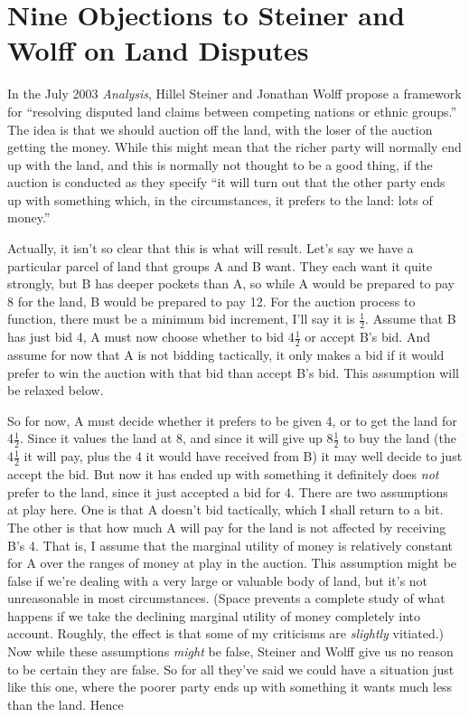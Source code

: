 %
%
%
%
%
%
%
%
%
%
\chapter{Nine Objections to Steiner and Wolff on Land Disputes}


In the July 2003 \textit{Analysis}, Hillel Steiner and Jonathan Wolff \citeyearpar{Steiner2003} propose a framework for ``resolving disputed land claims between competing nations or ethnic groups.'' The idea is that we should auction off the land, with the loser of the auction getting the money. While this might mean that the richer party will normally end up with the land, and this is normally not thought to be a good thing, if the auction is conducted as they specify ``it will turn out that the other party ends up with something which, in the circumstances, it prefers to the land: lots of money.''

Actually, it isn't so clear that this is what will result. Let's say we have a particular parcel of land that groups A and B want. They each want it quite strongly, but B has deeper pockets than A, so while A would be prepared to pay 8 for the land, B would be prepared to pay 12.  For the auction process to function, there must be a minimum bid increment, I'll say it is \(\frac{1}{2}\). Assume that B has just bid 4, A must now choose whether to bid 4\(\frac{1}{2}\) or accept B's bid. And assume for now that A is not bidding tactically, it only makes a bid if it would prefer to win the auction with that bid than accept B's bid. This assumption will be relaxed below.

So for now, A must decide whether it prefers to be given 4, or to get the land for 4\(\frac{1}{2}\). Since it values the land at 8, and since it will give up 8\(\frac{1}{2}\) to buy the land (the 4\(\frac{1}{2}\) it will pay, plus the 4 it would have received from B) it may well decide to just accept the bid. But now it has ended up with something it definitely does \textit{not} prefer to the land, since it just accepted a bid for 4. There are two assumptions at play here. One is that A doesn't bid tactically, which I shall return to a bit. The other is that how much A will pay for the land is not affected by receiving B's 4. That is, I assume that the marginal utility of money is relatively constant for A over the ranges of money at play in the auction. This assumption might be false if we're dealing with a very large or valuable body of land, but it's not unreasonable in most circumstances. (Space prevents a complete study of what happens if we take the declining marginal utility of money completely into account. Roughly, the effect is that some of my criticisms are \textit{slightly} vitiated.) Now while these assumptions \textit{might} be false, Steiner and Wolff give us no reason to be certain they are false. So for all they've said we could have a situation just like this one, where the poorer party ends up with something it wants much less than the land. Hence

